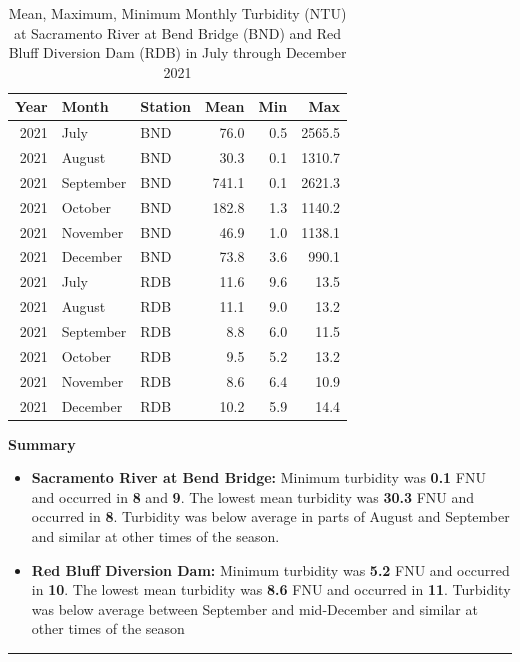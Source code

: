 \documentclass[
]{book}
\providecommand{\tightlist}{%
  \setlength{\itemsep}{0pt}\setlength{\parskip}{0pt}}
\theoremstyle{definition}
\theoremstyle{definition}
\theoremstyle{definition}
\theoremstyle{definition}
\theoremstyle{remark}
\begin{document}
\begin{table}
\centering
\caption{Mean, Maximum, Minimum Monthly Turbidity (NTU) at Sacramento River at Bend Bridge (BND) and Red Bluff Diversion Dam (RDB) in July through December 2021}
\centering
\begin{tabular}[t]{rllrrr}
\hline
Year & Month & Station & Mean & Min & Max\\
\hline
2021 & July & BND & 76.0 & 0.5 & 2565.5\\
\hline
2021 & August & BND & 30.3 & 0.1 & 1310.7\\
\hline
2021 & September & BND & 741.1 & 0.1 & 2621.3\\
\hline
2021 & October & BND & 182.8 & 1.3 & 1140.2\\
\hline
2021 & November & BND & 46.9 & 1.0 & 1138.1\\
\hline
2021 & December & BND & 73.8 & 3.6 & 990.1\\
\hline
2021 & July & RDB & 11.6 & 9.6 & 13.5\\
\hline
2021 & August & RDB & 11.1 & 9.0 & 13.2\\
\hline
2021 & September & RDB & 8.8 & 6.0 & 11.5\\
\hline
2021 & October & RDB & 9.5 & 5.2 & 13.2\\
\hline
2021 & November & RDB & 8.6 & 6.4 & 10.9\\
\hline
2021 & December & RDB & 10.2 & 5.9 & 14.4\\
\hline
\end{tabular}
\end{table}

\textbf{Summary}

\begin{itemize}
\tightlist
\item
  \textbf{Sacramento River at Bend Bridge:} Minimum turbidity was \textbf{0.1} FNU and occurred in \textbf{8} and \textbf{9}. The lowest mean turbidity was \textbf{30.3} FNU and occurred in \textbf{8}. Turbidity was below average in parts of August and September and similar at other times of the season.
\item
  \textbf{Red Bluff Diversion Dam:} Minimum turbidity was \textbf{5.2} FNU and occurred in \textbf{10}. The lowest mean turbidity was \textbf{8.6} FNU and occurred in \textbf{11}. Turbidity was below average between September and mid-December and similar at other times of the season
\end{itemize}

\begin{center}\rule{0.5\linewidth}{0.5pt}\end{center}
\end{document}
